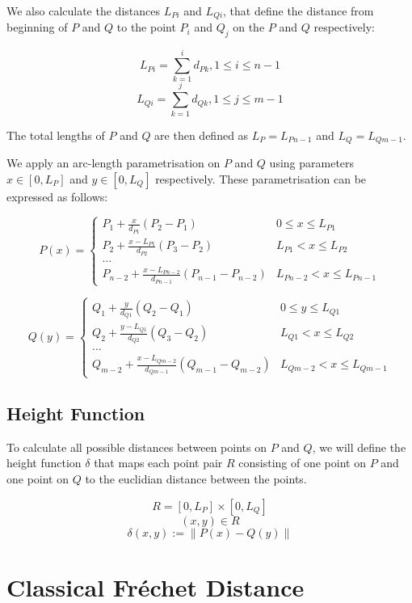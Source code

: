 We also calculate the distances $L_{Pi}$ and $L_{Qi}$, that define the distance from beginning of $P$ and $Q$ to the point $P_i$ and $Q_j$ on the $P$ and $Q$ respectively:

$$L_{Pi} = \sum\limits_{k=1}^{i} {d_{Pk}}, 1 \leq i \leq n-1$$
$$L_{Qi} = \sum\limits_{k=1}^{j} {d_{Qk}}, 1 \leq j \leq m-1$$

The total lengths of $P$ and $Q$ are then defined as $L_P = L_{Pn-1}$ and $L_Q = L_{Qm-1}$.

We apply an arc-length parametrisation on $P$ and $Q$ using parameters $x \in [0, L_P]$ and $y \in [0, L_Q]$ respectively. These parametrisation can be expressed as follows:

\[ P(x) =
\begin{cases} 
	P_1 + \frac{x}{d_{P1}}(P_2-P_1) & 0 \leq x \leq L_{P1} \\
	P_2 + \frac{x-L_{P1}}{d_{P2}}(P_3-P_2) & L_{P1} < x \leq L_{P2} \\
	\dots \\
	P_{n-2} + \frac{x-L_{Pn-2}}{d_{Pn-1}}(P_{n-1}-P_{n-2}) & L_{Pn-2} < x \leq L_{Pn-1}
\end{cases}
\]

\[ Q(y) =
\begin{cases} 
	Q_1 + \frac{y}{d_{Q1}}(Q_2-Q_1) & 0 \leq y \leq L_{Q1} \\
	Q_2 + \frac{y-L_{Q1}}{d_{Q2}}(Q_3-Q_2) & L_{Q1} < x \leq L_{Q2} \\
	\dots \\
	Q_{m-2} + \frac{x-L_{Qm-2}}{d_{Qm-1}}(Q_{m-1}-Q_{m-2}) & L_{Qm-2} < x \leq L_{Qm-1}
\end{cases}
\]

\subsection{Height Function} \label{heightfunc}

To calculate all possible distances between points on $P$ and $Q$, we will define the height function $\delta$ that maps each point pair $R$ consisting of one point on $P$ and one point on $Q$ to the euclidian distance between the points.

$$R = [0, L_P ] \times [0, L_Q]$$
$$(x, y) \in R$$
$$\delta(x, y) := \left\| P(x) - Q(y) \right\|$$

\section{Classical Fréchet Distance}

